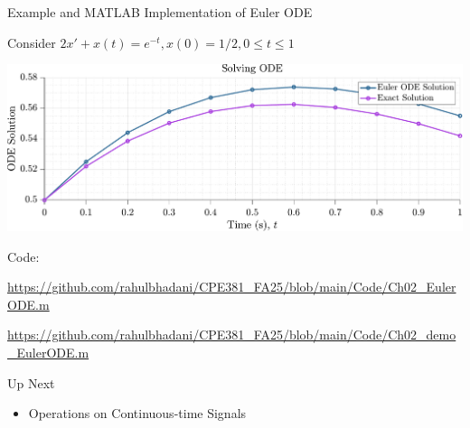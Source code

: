 \documentclass[aspectratio=169,xcolor=dvipsnames,svgnames,x11names,fleqn]{beamer}
\begin{document}
\begin{frame}{Example and MATLAB Implementation of Euler ODE}

Consider $2x' + x(t) = e^{-t}, x(0) = 1/2, 0\leq t\leq 1$

\begin{center}

\includegraphics[width=0.9\linewidth]{../Code/figures/Ch02_demo_EulerODE.pdf}

\end{center}

\tiny



Code: 

\url{https://github.com/rahulbhadani/CPE381_FA25/blob/main/Code/Ch02_EulerODE.m}


\url{https://github.com/rahulbhadani/CPE381_FA25/blob/main/Code/Ch02_demo_EulerODE.m}


\end{frame}

\begin{frame}{Up Next}
\begin{itemize}
    \item Operations on Continuous-time Signals
\end{itemize}
    
\end{frame}
\end{document}
